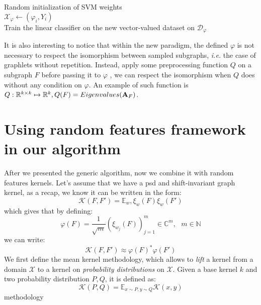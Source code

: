 \begin{algorithm}[H]
\DontPrintSemicolon
  \\
  \\
  \Algo{\\}
  Random initialization of SVM weights\\
  $\mathcal{X}_{\varphi}\gets (\varphi_i,Y_i)$\\
  Train the linear classifier on the new vector-valued dataset on $\mathcal{D}_{\varphi}$
\caption{$GSA-\varphi$}
\end{algorithm}

It is also interesting to notice that within the new paradigm, the defined $\varphi$ is not necessary to respect the isomorphism between sampled subgraphs, \emph{i.e.} the case of graphlets without repetition. Instead, apply some preprocessing function $Q$ on a subgraph $F$ before passing it to $\varphi$ , we can respect the isomorphism  when $Q$ does without any condition on $\varphi$. An example of such function is $Q:\mathbb{R}^{k\times k}\mapsto \mathbb{R}^k, Q(F)=Eigenvalues(\mathbf{A}_F)$.

\iffalse
\section{Using random features framework in our algorithm}
After we presented the generic algorithm, now we combine it with random features kernels.
Let's assume that we have a psd and shift-invariant graph kernel, as a recap, we know it can be written in the form:
\begin{equation}
\mathcal{K}(F,F')= \mathbb{E}_w, \xi_w(F)\xi_w(F')
\end{equation}
which gives that by defining:
\begin{equation}
\varphi(F) = \frac{1}{\sqrt{m}} ( \xi_{w_j}(F) )_{j=1}^m \in \mathbb{C}^m,~~~ m\in \mathbb{N}
\end{equation}
we can write:
\[
\mathcal{K}(F,F')\approx \varphi(F)^*\varphi(F')
\]
We first define the mean kernel methodology, which  allows to \emph{lift} a kernel from a domain $\mathcal{X}$ to a kernel on \emph{probability distributions} on $\mathcal{X}$. Given a base kernel $k$ and two probability distribution $P,Q$, it is defined as:
\begin{equation}
\label{eq:mean_kernel}
\mathcal{K}(P,Q) = \mathbb{E}_{x \sim P, y \sim Q} \mathcal{K}(x,y)
\end{equation}
methodology 


